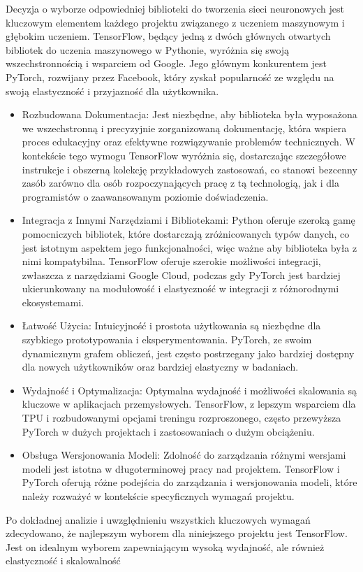 \documentclass[a4paper,twoside,12pt]{book}
\begin{document}
Decyzja o wyborze odpowiedniej biblioteki do tworzenia sieci neuronowych jest kluczowym elementem każdego projektu związanego z uczeniem maszynowym i głębokim uczeniem. TensorFlow, będący jedną z dwóch głównych otwartych bibliotek do uczenia maszynowego w Pythonie, wyróżnia się swoją wszechstronnością i wsparciem od Google. Jego głównym konkurentem jest PyTorch, rozwijany przez Facebook, który zyskał popularność ze względu na swoją elastyczność i przyjazność dla użytkownika.
\begin{itemize}
  \item Rozbudowana Dokumentacja: Jest niezbędne, aby biblioteka była wyposażona we wszechstronną i precyzyjnie zorganizowaną dokumentację, która wspiera proces edukacyjny oraz efektywne rozwiązywanie problemów technicznych. W kontekście tego wymogu TensorFlow wyróżnia się, dostarczając szczegółowe instrukcje i obszerną kolekcję przykładowych zastosowań, co stanowi bezcenny zasób zarówno dla osób rozpoczynających pracę z tą technologią, jak i dla programistów o zaawansowanym poziomie doświadczenia.
  \item Integracja z Innymi Narzędziami i Bibliotekami: Python oferuje szeroką gamę pomocniczych bibliotek, które dostarczają zróżnicowanych typów danych, co jest istotnym aspektem jego funkcjonalności, więc ważne aby biblioteka była z nimi kompatybilna. TensorFlow oferuje szerokie możliwości integracji, zwłaszcza z narzędziami Google Cloud\cite{bib:COLAB}, podczas gdy PyTorch jest bardziej ukierunkowany na modułowość i elastyczność w integracji z różnorodnymi ekosystemami.
  \item Łatwość Użycia: Intuicyjność i prostota użytkowania są niezbędne dla szybkiego prototypowania i eksperymentowania. PyTorch, ze swoim dynamicznym grafem obliczeń, jest często postrzegany jako bardziej dostępny dla nowych użytkowników oraz bardziej elastyczny w badaniach.
  \item Wydajność i Optymalizacja: Optymalna wydajność i możliwości skalowania są kluczowe w aplikacjach przemysłowych. TensorFlow, z lepszym wsparciem dla TPU\cite{bib:TPU} i rozbudowanymi opcjami treningu rozproszonego, często przewyższa PyTorch w dużych projektach i zastosowaniach o dużym obciążeniu.
  \item Obsługa Wersjonowania Modeli: Zdolność do zarządzania różnymi wersjami modeli jest istotna w długoterminowej pracy nad projektem. TensorFlow i PyTorch oferują różne podejścia do zarządzania i wersjonowania modeli, które należy rozważyć w kontekście specyficznych wymagań projektu.
\end{itemize}
Po dokładnej analizie i uwzględnieniu wszystkich kluczowych wymagań zdecydowano, że najlepszym wyborem dla niniejszego projektu jest TensorFlow. Jest on idealnym wyborem zapewniającym wysoką wydajność, ale również elastyczność i skalowalność
\end{document}
